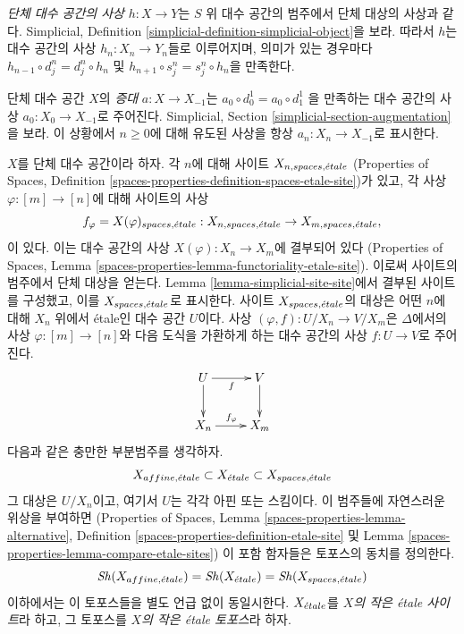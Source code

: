 \medskip\noindent
{\it 단체 대수 공간의 사상} $h : X \to Y$는 $S$ 위 대수 공간의
범주에서 단체 대상의 사상과 같다. Simplicial, Definition
\ref{simplicial-definition-simplicial-object}을 보라.
따라서 $h$는 대수 공간의 사상 $h_n : X_n \to Y_n$들로 이루어지며,
의미가 있는 경우마다
$h_{n - 1} \circ d^n_j = d^n_j \circ h_n$ 및
$h_{n + 1} \circ s^n_j = s^n_j \circ h_n$을 만족한다.

\medskip\noindent
단체 대수 공간 $X$의 {\it 증대} $a : X \to X_{-1}$는
$
a_0 \circ d^1_0 = a_0 \circ d^1_1
$
을 만족하는 대수 공간의 사상 $a_0 : X_0 \to X_{-1}$로 주어진다.
Simplicial, Section \ref{simplicial-section-augmentation}을 보라.
이 상황에서 $n \geq 0$에 대해 유도된 사상을 항상
$a_n : X_n \to X_{-1}$로 표시한다.

\medskip\noindent
$X$를 단체 대수 공간이라 하자. 각 $n$에 대해 사이트
$X_{n, spaces, {\acute{e}tale}}$ (Properties of Spaces, Definition
\ref{spaces-properties-definition-spaces-etale-site})가 있고,
각 사상 $\varphi : [m] \to [n]$에 대해 사이트의 사상
$$
f_\varphi = X(\varphi)_{spaces, {\acute{e}tale}} :
X_{n, spaces, {\acute{e}tale}} \to X_{m, spaces, {\acute{e}tale}},
$$
이 있다. 이는 대수 공간의 사상
$X(\varphi) : X_n \to X_m$에 결부되어 있다
(Properties of Spaces, Lemma
\ref{spaces-properties-lemma-functoriality-etale-site}).
이로써 사이트의 범주에서 단체 대상을 얻는다.
Lemma \ref{lemma-simplicial-site-site}에서 결부된 사이트를 구성했고,
이를 $X_{spaces, {\acute{e}tale}}$로 표시한다.
사이트 $X_{spaces, {\acute{e}tale}}$의 대상은
어떤 $n$에 대해 $X_n$ 위에서 \'etale인 대수 공간 $U$이다.
사상 $(\varphi, f) : U/X_n \to V/X_m$은
$\Delta$에서의 사상 $\varphi : [m] \to [n]$와
다음 도식을 가환하게 하는 대수 공간의 사상 $f : U \to V$로 주어진다.
$$
\xymatrix{
U \ar[r]_f \ar[d] & V \ar[d] \\
X_n \ar[r]^{f_\varphi} & X_m
}
$$
다음과 같은 충만한 부분범주를 생각하자.
$$
X_{affine, {\acute{e}tale}} \subset X_{\acute{e}tale} \subset X_{spaces, {\acute{e}tale}}
$$
그 대상은 $U/X_n$이고, 여기서 $U$는 각각 아핀 또는 스킴이다.
이 범주들에 자연스러운 위상을 부여하면
(Properties of Spaces, Lemma
\ref{spaces-properties-lemma-alternative}, Definition
\ref{spaces-properties-definition-etale-site} 및 Lemma
\ref{spaces-properties-lemma-compare-etale-sites})
이 포함 함자들은 토포스의 동치를 정의한다.
$$
\mathop{\mathit{Sh}}\nolimits(X_{affine, {\acute{e}tale}}) = \mathop{\mathit{Sh}}\nolimits(X_{\acute{e}tale}) = \mathop{\mathit{Sh}}\nolimits(X_{spaces, {\acute{e}tale}})
$$
이하에서는 이 토포스들을 별도 언급 없이 동일시한다.
$X_{\acute{e}tale}$를 {\it $X$의 작은 \'etale 사이트}라 하고,
그 토포스를 {\it $X$의 작은 \'etale 토포스}라 하자.

